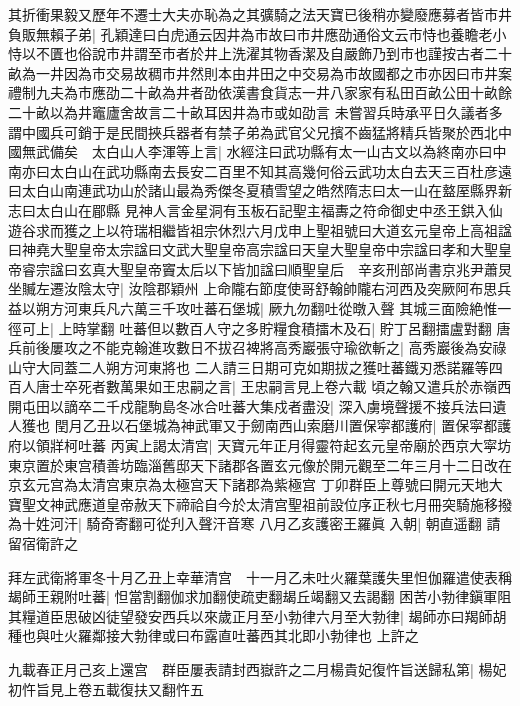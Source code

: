其折衝果毅又歷年不遷士大夫亦恥為之其彍騎之法天寶已後稍亦變廢應募者皆市井負販無賴子弟|{
	孔穎達曰白虎通云因井為市故曰市井應劭通俗文云市恃也養瞻老小恃以不匱也俗說市井謂至市者於井上洗濯其物香潔及自嚴飾乃到市也謹按古者二十畝為一井因為市交易故稠市井然則本由井田之中交易為市故國都之市亦因曰市井案禮制九夫為市應劭二十畝為井者劭依漢書食貨志一井八家家有私田百畝公田十畝餘二十畝以為井竈廬舍故言二十畝耳因井為市或如劭言}
未嘗習兵時承平日久議者多謂中國兵可銷于是民間挾兵器者有禁子弟為武官父兄擯不齒猛將精兵皆聚於西北中國無武備矣　太白山人李渾等上言|{
	水經注曰武功縣有太一山古文以為終南亦曰中南亦曰太白山在武功縣南去長安二百里不知其高幾何俗云武功太白去天三百杜彦遠曰太白山南連武功山於諸山最為秀傑冬夏積雪望之皓然隋志曰太一山在盩厔縣界新志曰太白山在郿縣}
見神人言金星洞有玉板石記聖主福夀之符命御史中丞王鉷入仙遊谷求而獲之上以符瑞相繼皆祖宗休烈六月戊申上聖祖號曰大道玄元皇帝上高祖諡曰神堯大聖皇帝太宗諡曰文武大聖皇帝高宗諡曰天皇大聖皇帝中宗諡曰孝和大聖皇帝睿宗諡曰玄真大聖皇帝竇太后以下皆加諡曰順聖皇后　辛亥刑部尚書京兆尹蕭炅坐贓左遷汝陰太守|{
	汝陰郡穎州}
上命隴右節度使哥舒翰帥隴右河西及突厥阿布思兵益以朔方河東兵凡六萬三千攻吐蕃石堡城|{
	厥九勿翻吐從暾入聲}
其城三面險絶惟一徑可上|{
	上時掌翻}
吐蕃但以數百人守之多貯糧食積擂木及石|{
	貯丁呂翻擂盧對翻}
唐兵前後屢攻之不能克翰進攻數日不拔召裨將高秀巖張守瑜欲斬之|{
	高秀巖後為安祿山守大同蓋二人朔方河東將也}
二人請三日期可克如期拔之獲吐蕃鐵刃悉諾羅等四百人唐士卒死者數萬果如王忠嗣之言|{
	王忠嗣言見上卷六載}
頃之翰又遣兵於赤嶺西開屯田以謫卒二千戍龍駒島冬冰合吐蕃大集戍者盡没|{
	深入虜境聲援不接兵法曰遺人獲也}
閏月乙丑以石堡城為神武軍又于劒南西山索磨川置保寜都護府|{
	置保寜都護府以領牂柯吐蕃}
丙寅上謁太清宫|{
	天寶元年正月得靈符起玄元皇帝廟於西京大寜坊東京置於東宫積善坊臨淄舊邸天下諸郡各置玄元像於開元觀至二年三月十二日改在京玄元宫為太清宫東京為太極宫天下諸郡為紫極宫}
丁卯群臣上尊號曰開元天地大寶聖文神武應道皇帝赦天下禘祫自今於太清宫聖祖前設位序正秋七月冊突騎施移撥為十姓河汗|{
	騎奇寄翻可從刋入聲汗音寒}
八月乙亥護密王羅眞入朝|{
	朝直遥翻}
請留宿衛許之

拜左武衛將軍冬十月乙丑上幸華清宫　十一月乙未吐火羅葉護失里怛伽羅遣使表稱朅師王親附吐蕃|{
	怛當割翻伽求加翻使疏吏翻朅丘竭翻又去謁翻}
困苦小勃律鎭軍阻其糧道臣思破凶徒望發安西兵以來歲正月至小勃律六月至大勃律|{
	朅師亦曰羯師胡種也與吐火羅鄰接大勃律或曰布露直吐蕃西其北即小勃律也}
上許之

九載春正月己亥上還宫　群臣屢表請封西嶽許之二月楊貴妃復忤旨送歸私第|{
	楊妃初忤旨見上卷五載復扶又翻忤五}


